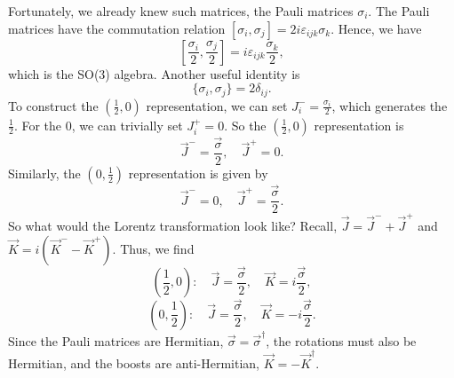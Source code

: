 \documentclass[11pt]{article}
\theoremstyle{definition}
\begin{document}
Fortunately, we already knew such matrices, the Pauli matrices $\sigma_i$. The Pauli matrices have the commutation relation $[\sigma_i, \sigma_j] = 2i\varepsilon_{ijk}\sigma_k$. Hence, we have
\begin{equation}
    \left[ \frac{\sigma_i}{2}, \frac{\sigma_j}{2}\right] = i\varepsilon_{ijk}\frac{\sigma_k}{2},
\end{equation}
which is the SO(3) algebra. Another useful identity is
\begin{equation}
    \{\sigma_i, \sigma_j\} =  2\delta_{ij}.
\end{equation}
To construct the $(\frac{1}{2},0)$ representation, we can set $J^-_i=\frac{\sigma_i}{2}$, which generates the $\frac{1}{2}$. For the 0, we can trivially set $J^+_i = 0$. So the $(\frac{1}{2},0)$ representation is
\begin{equation}
    \vec{J}^- = \frac{\vec{\sigma}}{2},\quad  \vec{J}^+ = 0.
\end{equation}
Similarly, the $(0, \frac{1}{2})$ representation is given by
\begin{equation}
    \vec{J}^- = 0 ,\quad  \vec{J}^+ = \frac{\vec{\sigma}}{2}.
\end{equation}
So what would the Lorentz transformation look like? Recall, $\vec{J} = \vec{J}^- + \vec{J}^+$ and $\vec{K} = i(\vec{K}^- - \vec{K}^+)$. Thus, we find
\begin{equation}
    \left(\frac{1}{2}, 0\right): \quad \vec{J} = \frac{\vec{\sigma}}{2}, \quad\vec{K} = i\frac{\vec{\sigma}}{2},
\end{equation}
\begin{equation}
    \left(0,\frac{1}{2}\right): \quad \vec{J} = \frac{\vec{\sigma}}{2}, \quad\vec{K} = -i\frac{\vec{\sigma}}{2}.
\end{equation}
Since the Pauli matrices are Hermitian, $\vec{\sigma}= \vec{\sigma}^\dagger$, the rotations must also be Hermitian, and the boosts are anti-Hermitian, $\vec{K}= -\vec{K}^\dagger$.
\end{document}
